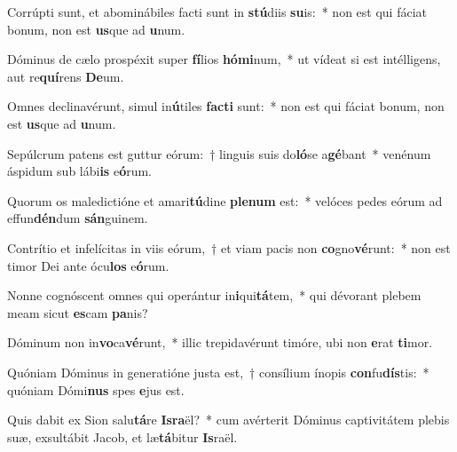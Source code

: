 \item Corrúpti sunt, et abominábiles facti sunt in \textbf{stú}diis \textbf{su}is:~* non est qui fáciat bonum, non est \textbf{us}que ad \textbf{u}num.
\item Dóminus de cælo prospéxit super \textbf{fí}lios \textbf{hó}\textbf{mi}num,~* ut vídeat si est intélligens, aut re\textbf{quí}rens \textbf{De}um.
\item Omnes declinavérunt, simul in\textbf{ú}tiles \textbf{fac}\textbf{ti} sunt:~* non est qui fáciat bonum, non est \textbf{us}que ad \textbf{u}num.
\item Sepúlcrum patens est guttur eórum:~† linguis suis do\textbf{ló}se a\textbf{gé}bant~* venénum áspidum sub lábi\textbf{is} e\textbf{ó}rum.
\item Quorum os maledictióne et amari\textbf{tú}dine \textbf{ple}\textbf{num} est:~* velóces pedes eórum ad effun\textbf{dén}dum \textbf{sán}guinem.
\item Contrítio et infelícitas in viis eórum,~† et viam pacis non \textbf{co}gno\textbf{vé}runt:~* non est timor Dei ante ócu\textbf{los} e\textbf{ó}rum.
\item Nonne cognóscent omnes qui operántur in\textbf{i}qui\textbf{tá}tem,~* qui dévorant plebem meam sicut \textbf{es}cam \textbf{pa}nis?
\item Dóminum non in\textbf{vo}ca\textbf{vé}runt,~* illic trepidavérunt timóre, ubi non \textbf{e}rat \textbf{ti}mor.
\item Quóniam Dóminus in generatióne justa est,~† consílium ínopis \textbf{con}fu\textbf{dís}tis:~* quóniam Dómi\textbf{nus} spes \textbf{e}jus est.
\item Quis dabit ex Sion salu\textbf{tá}re \textbf{Is}\textbf{ra}ël?~* cum avérterit Dóminus captivitátem plebis suæ, exsultábit Jacob, et læ\textbf{tá}bitur \textbf{Is}raël.
